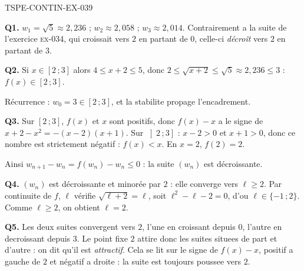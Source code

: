 \begin{corrige}{TSPE-CONTIN-EX-039}

\textbf{Q1.} $w_1 = \sqrt5 \approx 2{,}236$ ; $w_2 \approx 2{,}058$ ; $w_3 \approx 2{,}014$. Contrairement a la suite de l'exercice \textsc{ex-034}, qui croissait vers $2$ en partant de $0$, celle-ci \emph{décroît} vers $2$ en partant de $3$.

\textbf{Q2.} Si $x \in [2\,;3]$ alors $4 \leq x+2 \leq 5$, donc $2 \leq \sqrt{x+2} \leq \sqrt5 \approx 2{,}236 \leq 3$ : $f(x) \in [2\,;3]$.

Récurrence : $w_0 = 3 \in [2\,;3]$, et la stabilite propage l'encadrement.

\textbf{Q3.} Sur $[2\,;3]$, $f(x)$ et $x$ sont positifs, donc $f(x) - x$ a le signe de $x + 2 - x^2 = -(x-2)(x+1)$. Sur $\left]2\,;3\right]$ : $x-2 > 0$ et $x+1 > 0$, donc ce nombre est strictement négatif : $f(x) < x$. En $x = 2$, $f(2) = 2$.

Ainsi $w_{n+1} - w_n = f(w_n) - w_n \leq 0$ : la suite $(w_n)$ est décroissante.

\textbf{Q4.} $(w_n)$ est décroissante et minorée par $2$ : elle converge vers $\ell \geq 2$. Par continuite de $f$, $\ell$ vérifie $\sqrt{\ell+2} = \ell$, soit $\ell^2 - \ell - 2 = 0$, d'ou $\ell \in \{-1\,;2\}$. Comme $\ell \geq 2$, on obtient $\ell = 2$.

\textbf{Q5.} Les deux suites convergent vers $2$, l'une en croissant depuis $0$, l'autre en decroissant depuis $3$. Le point fixe $2$ attire donc les suites situees de part et d'autre : on dit qu'il est \emph{attractif}. Cela se lit sur le signe de $f(x) - x$, positif a gauche de $2$ et négatif a droite : la suite est toujours poussee vers $2$.
\end{corrige}
